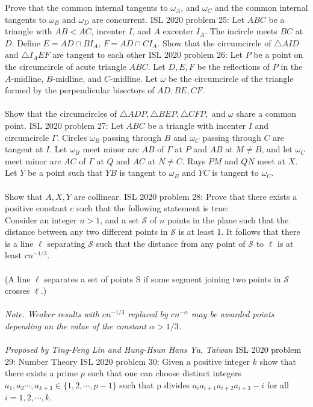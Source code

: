 Prove that the common internal tangents to $\omega_A$, and $\omega_C$ and the common internal tangents to $\omega_B$ and $\omega_D$ are concurrent. 
ISL 2020 problem 25:  Let $ABC$ be a triangle with $AB < AC$, incenter $I$, and $A$ excenter $I_A$. The incircle meets $BC$ at $D$. Define $E = AD\cap BI_A$, $F = AD\cap CI_A$. Show that the circumcircle of $\triangle AID$ and $\triangle I_AEF$ are tangent to each other 
ISL 2020 problem 26:  Let $P$ be a point on the circumcircle of acute triangle $ABC$. Let $D,E,F$ be the reflections of $P$ in the $A$-midline, $B$-midline, and $C$-midline. Let $\omega$ be the circumcircle of the triangle formed by the perpendicular bisectors of $AD, BE, CF$. \\\\
Show that the circumcircles of $\triangle ADP, \triangle BEP, \triangle CFP,$ and $\omega$ share a common point. 
ISL 2020 problem 27:  Let $ABC$ be a triangle with incenter $I$ and circumcircle $\Gamma$. Circles $\omega_B$ passing through $B$ and $\omega_C$ passing through $C$ are tangent at $I$. Let $\omega_B$ meet minor arc $AB$ of $\Gamma$ at $P$ and $AB$ at $M\neq B$, and let $\omega_C$ meet minor arc $AC$ of $\Gamma$ at $Q$ and $AC$ at $N\neq C$. Rays $PM$ and $QN$ meet at $X$. Let $Y$ be a point such that $YB$ is tangent to $\omega_B$ and $YC$ is tangent to $\omega_C$. \\\\
Show that $A,X,Y$ are collinear. 
ISL 2020 problem 28:  Prove that there exists a positive constant $c$ such that the following statement is true: \\
Consider an integer $n > 1$, and a set $\mathcal S$ of $n$ points in the plane such that the distance between any two different points in $\mathcal S$ is at least 1. It follows that there is a line $\ell$ separating $\mathcal S$ such that the distance from any point of $\mathcal S$ to $\ell$ is at least $cn^{-1/3}$. \\\\
(A line $\ell$ separates a set of points S if some segment joining two points in $\mathcal S$ crosses $\ell$.) \\\\
\textit{Note. Weaker results with $cn^{-1/3}$ replaced by $cn^{-\alpha}$ may be awarded points depending on the value of the constant $\alpha > 1/3$.} \\\\
\textit{Proposed by Ting-Feng Lin and Hung-Hsun Hans Yu, Taiwan} 
ISL 2020 problem 29:  Number Theory 
ISL 2020 problem 30:  Given a positive integer $k$ show that there exists a prime $p$ such that one can choose distinct integers $a_1,a_2\cdots, a_{k+3} \in \{1, 2, \cdots ,p-1\}$  such that p divides $a_ia_{i+1}a_{i+2}a_{i+3}-i$ for all $i= 1, 2, \cdots, k$. \\\\\\
